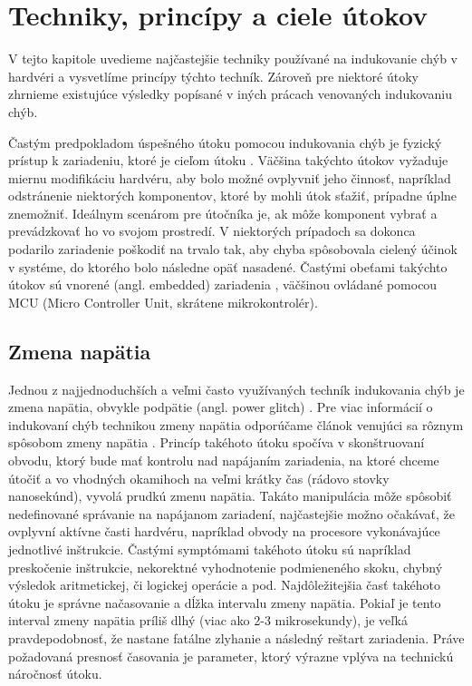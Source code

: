 \chapter{Techniky, princípy a ciele útokov}

\label{kap:teoria}

V tejto kapitole uvedieme najčastejšie techniky používané na indukovanie chýb v hardvéri a vysvetlíme princípy týchto techník. Zároveň pre niektoré útoky zhrnieme existujúce výsledky popísané v iných prácach venovaných indukovaniu chýb.

Častým predpokladom úspešného útoku pomocou indukovania chýb je fyzický prístup k zariadeniu, ktoré je cieľom útoku \cite{lowcost}. Väčšina takýchto útokov vyžaduje miernu modifikáciu hardvéru, aby bolo možné ovplyvniť jeho činnosť, napríklad odstránenie niektorých komponentov, ktoré by mohli útok sťažiť, prípadne úplne znemožniť. Ideálnym scenárom pre útočníka je, ak môže komponent vybrať a prevádzkovať ho vo svojom prostredí. V niektorých prípadoch sa dokonca podarilo zariadenie poškodiť na trvalo tak, aby chyba spôsobovala cielený účinok v systéme, do ktorého bolo následne opäť nasadené. Častými obeťami takýchto útokov sú vnorené (angl. embedded) zariadenia \cite{lowcost}, väčšinou ovládané pomocou MCU (Micro Controller Unit, skrátene mikrokontrolér).

\section{Zmena napätia}
Jednou z najjednoduchších a veľmi často využívaných techník indukovania chýb je zmena napätia, obvykle podpätie (angl. power glitch) \cite{crowbars, vccOnTheCheap, crypto}. Pre viac informácií o indukovaní chýb technikou zmeny napätia odporúčame článok venujúci sa rôznym spôsobom zmeny napätia \cite{powerGlitch}. Princíp takéhoto útoku spočíva v skonštruovaní obvodu, ktorý bude mať kontrolu nad napájaním zariadenia, na ktoré chceme útočiť a vo vhodných okamihoch na veľmi krátky čas (rádovo stovky nanosekúnd), vyvolá prudkú zmenu napätia. Takáto manipulácia môže spôsobiť nedefinované správanie na napájanom zariadení, najčastejšie možno očakávať, že ovplyvní aktívne časti hardvéru, napríklad obvody na procesore vykonávajúce jednotlivé inštrukcie. Častými symptómami takéhoto útoku sú napríklad preskočenie inštrukcie, nekorektné vyhodnotenie podmieneného skoku, chybný výsledok aritmetickej, či logickej operácie a pod. Najdôležitejšia časť takéhoto útoku je správne načasovanie a dĺžka intervalu zmeny napätia. Pokiaľ je tento interval zmeny napätia príliš dlhý (viac ako 2-3 mikrosekundy), je veľká pravdepodobnosť, že nastane fatálne zlyhanie a následný reštart zariadenia. Práve požadovaná presnosť časovania je parameter, ktorý výrazne vplýva na technickú náročnosť útoku.

